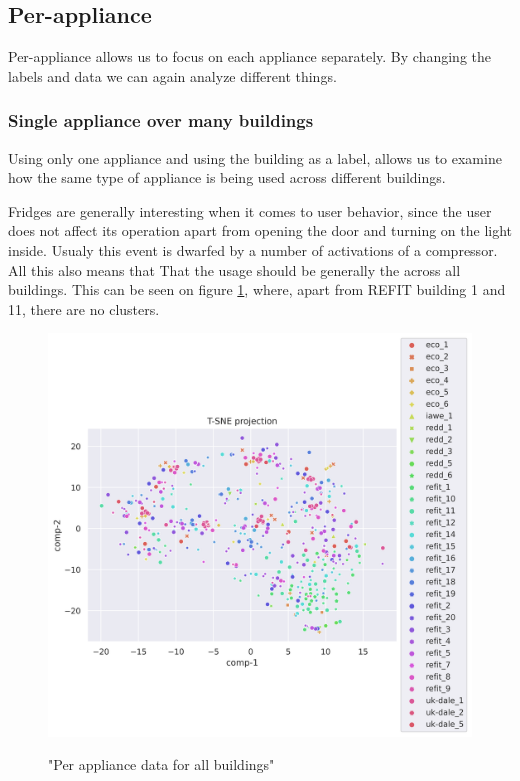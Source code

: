 \subsection{Per-appliance}

Per-appliance allows us to focus on each appliance separately.
By changing the labels and data we can again analyze different things.

\subsubsection{Single appliance over many buildings}

Using only one appliance and using the building as a label,
allows us to examine how the same type of appliance is being used across different buildings.

Fridges are generally interesting when it comes to user behavior, since the user does not affect
its operation apart from opening the door and turning on the light inside. Usualy this
event is dwarfed by a number of activations of a compressor. All this also means that
That the usage should be generally the across all buildings. 
This can be seen on figure \ref{fig:tsne_pa_scatter_all_fridge},
where, apart from REFIT building 1 and 11, there are no clusters.

\begin{figure}[H]
	\centering
	\caption{"Per appliance data for all buildings"}
	\includegraphics[width=1.2\textwidth]{Figures/TSNE/TSNE_per_appliance/all/scatter_all_fridge_freeezer_fridge freezer.png}
	\label{fig:tsne_pa_scatter_all_fridge}
\end{figure}

